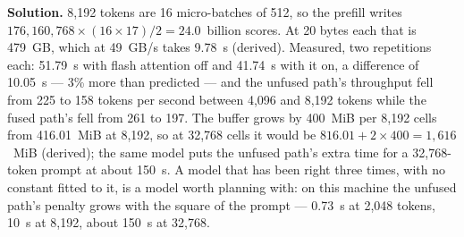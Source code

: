 \textbf{Solution.} 8,192 tokens are 16 micro-batches of 512, so the prefill
writes $176{,}160{,}768 \times (16 \times 17)/2 = 24.0$~billion scores. At 20 bytes
each that is 479~GB, which at 49~GB/s takes 9.78~s (derived). Measured, two
repetitions each: 51.79~s with flash attention off and 41.74~s with it on, a
difference of 10.05~s --- 3\% more than predicted --- and the unfused path's
throughput fell from 225 to 158 tokens per second between 4,096 and 8,192
tokens while the fused path's fell from 261 to 197. The buffer grows by 400~MiB
per 8,192 cells from 416.01~MiB at 8,192, so at 32,768 cells it would be
$816.01 + 2 \times 400 = 1{,}616$~MiB (derived); the same model puts the unfused
path's extra time for a 32,768-token prompt at about 150~s. A model that has
been right three times, with no constant fitted to it, is a model worth planning
with: on this machine the unfused path's penalty grows with the square of the
prompt --- 0.73~s at 2,048 tokens, 10~s at 8,192, about 150~s at 32,768.
